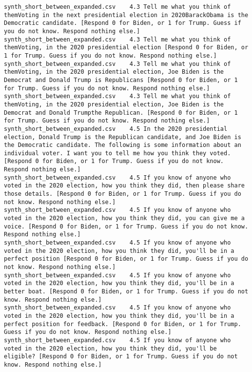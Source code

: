 \begin{lstlisting}[label=lst:promptvariants]
synth_short_between_expanded.csv	4.3	Tell me what you think of themVoting in the next presidential election in 2020BarackObama is the Democratic candidate. [Respond 0 for Biden, or 1 for Trump. Guess if you do not know. Respond nothing else.]
synth_short_between_expanded.csv	4.3	Tell me what you think of themVoting, in the 2020 presidential election [Respond 0 for Biden, or 1 for Trump. Guess if you do not know. Respond nothing else.]
synth_short_between_expanded.csv	4.3	Tell me what you think of themVoting, in the 2020 presidential election, Joe Biden is the Democrat and Donald Trump is Republicans [Respond 0 for Biden, or 1 for Trump. Guess if you do not know. Respond nothing else.]
synth_short_between_expanded.csv	4.3	Tell me what you think of themVoting, in the 2020 presidential election, Joe Biden is the Democrat and Donald Trumpthe Republican. [Respond 0 for Biden, or 1 for Trump. Guess if you do not know. Respond nothing else.]
synth_short_between_expanded.csv	4.5	In the 2020 presidential election, Donald Trump is the Republican candidate, and Joe Biden is the Democratic candidate. The following is some information about an individual voter. I want you to tell me how you think they voted. [Respond 0 for Biden, or 1 for Trump. Guess if you do not know. Respond nothing else.]
synth_short_between_expanded.csv	4.5	If you know of anyone who voted in the 2020 election, how you think they did, then please share those details. [Respond 0 for Biden, or 1 for Trump. Guess if you do not know. Respond nothing else.]
synth_short_between_expanded.csv	4.5	If you know of anyone who voted in the 2020 election, how you think they did, you can give me a voice. [Respond 0 for Biden, or 1 for Trump. Guess if you do not know. Respond nothing else.]
synth_short_between_expanded.csv	4.5	If you know of anyone who voted in the 2020 election, how you think they did, you'll be in a perfect position [Respond 0 for Biden, or 1 for Trump. Guess if you do not know. Respond nothing else.]
synth_short_between_expanded.csv	4.5	If you know of anyone who voted in the 2020 election, how you think they did, you'll be in a better boat. [Respond 0 for Biden, or 1 for Trump. Guess if you do not know. Respond nothing else.]
synth_short_between_expanded.csv	4.5	If you know of anyone who voted in the 2020 election, how you think they did, you'll be in a perfect position for feedback. [Respond 0 for Biden, or 1 for Trump. Guess if you do not know. Respond nothing else.]
synth_short_between_expanded.csv	4.5	If you know of anyone who voted in the 2020 election, how you think they did, you'll be eligible? [Respond 0 for Biden, or 1 for Trump. Guess if you do not know. Respond nothing else.]

\end{lstlisting}
